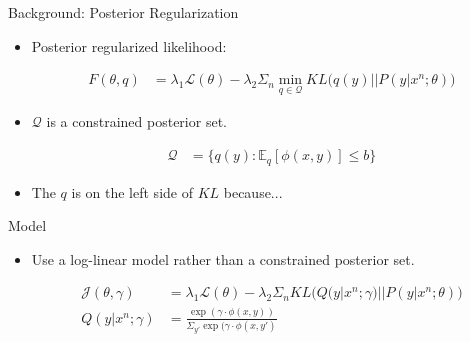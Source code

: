 \documentclass{beamer}
\begin{document}
\begin{frame}{Background: Posterior Regularization}{}
\begin{itemize}
\item Posterior regularized likelihood:

\begin{align*}
F(\theta, q) &= \lambda_1 \mathcal{L}(\theta) - \lambda_2 \Sigma_n  \min_{q \in \mathcal{Q}} KL \big( q(y) || P(y|x^n; \theta) \big)
\end{align*}

\item $\mathcal{Q}$ is a constrained posterior set.

\begin{align*}
\mathcal{Q} &= \{ q(y) : \mathbb{E}_q[\phi(x, y)] \leq b\}
\end{align*}

\item The $q$ is on the left side of $KL$ because...

\end{itemize}

\end{frame}

\begin{frame}{Model}{}
\begin{itemize}
\item Use a log-linear model rather than a constrained posterior set.

\begin{align*}
\mathcal{J}(\theta, \gamma) &= \lambda_1 \mathcal{L}(\theta) - \lambda_2 \Sigma_n KL \big( Q(y|x^n; \gamma) || P(y|x^n; \theta) \big) \\
Q(y|x^n; \gamma) &= \frac{\exp(\gamma \cdot \phi(x,y))}{\Sigma_{y'} \exp(\gamma \cdot \phi(x,y')}
\end{align*}


\end{itemize}

\end{frame}
\end{document}
